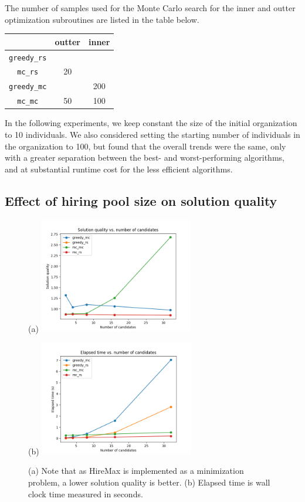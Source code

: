 The number of samples used for the Monte Carlo search for the inner and outter optimization subroutines are listed in the table below.

\begin{center}
	\begin{tabular}{ c|c|c } 
		 & outter & inner \\
		\hline
		\texttt{greedy\_rs} &  &  \\
		\texttt{mc\_rs} & 20 &  \\
 		\texttt{greedy\_mc} &  & 200 \\
 		\texttt{mc\_mc} & 50 & 100 \\
	\end{tabular}
\end{center}

In the following experiments, we keep constant the size of the initial organization to 10 individuals. 
We also considered setting the starting number of individuals in the organization to 100, but found that the overall trends were the same, only with a greater separation between the best- and worst-performing algorithms, and at substantial runtime cost for the less efficient algorithms.

\subsection{Effect of hiring pool size on solution quality}
\label{section:num-candidates}

\begin{figure}[h!]
	\centering
	(a) \includegraphics[width=0.6\textwidth]{figs/num_candidates_multi_ground_set_plot.png}
	
	(b) \includegraphics[width=0.6\textwidth]{figs/num_candidates_multi_ground_set_times_plot.png}
	\caption{(a) Note that as HireMax is implemented as a minimization problem, a lower solution quality is better. (b) Elapsed time is wall clock time measured in seconds.}
	\label{fig:num-candidates}
\end{figure} 

